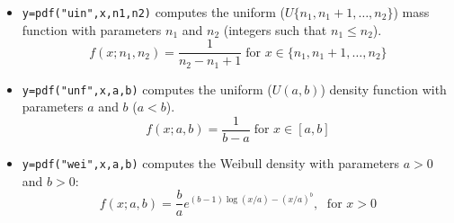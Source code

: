 \begin{mandescription}
\begin{itemize}
\item {} \verb!y=pdf("uin",x,n1,n2)! computes
  the  uniform ($U\{n_1,n_1+1,\dots,n_2\}$) mass function with parameters $n_1$ and $n_2$
  (integers such that $n_1 \le n_2$).
$$
     f(x; n_1, n_2) = \frac{ 1 }{ n_2 - n_1 + 1} \;\mbox{for } x \in \{n_1,n_1+1,\dots,n_2\}
$$

\item {} \verb!y=pdf("unf",x,a,b)! computes
  the  uniform ($U(a,b)$) density function with parameters $a$ and $b$ ($a < b$).
$$
     f(x; a, b) = \frac{1}{b-a} \;\mbox{for } x \in [a,b]
$$


\item {} \verb!y=pdf("wei",x,a,b)! computes the Weibull
  density with parameters $a > 0$ and $b > 0$:
$$
     f(x; a, b) = \frac{b}{a} e^{ (b-1)\log(x/a) - (x/a)^b }, \; \mbox{ for } x > 0
$$

\end{itemize}

\end{mandescription}


